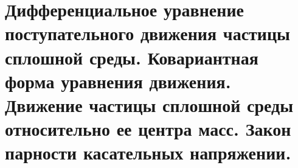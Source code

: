 \chapter{Дифференциальное уравнение поступательного движения частицы сплошной
среды. Ковариантная форма уравнения движения. Движение частицы сплошной
среды относительно ее центра масс. Закон парности касательных напряжении.}

\newpage
